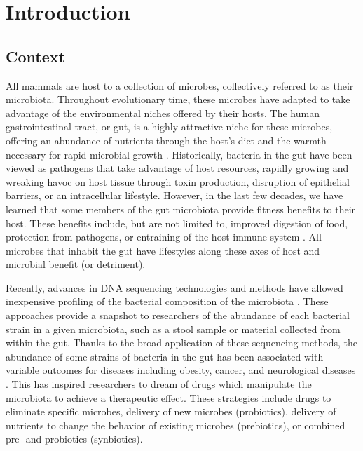 \documentclass[11pt,twocolumn,notitlepage,openany,twoside]{book}
\begin{document}
\chapter{Introduction}
\begin{refsection}

\section{Context}

All mammals are host to a collection of microbes, collectively referred to as their microbiota. Throughout evolutionary time, these microbes have adapted to take advantage of the environmental niches offered by their hosts. The human gastrointestinal tract, or gut, is a highly attractive niche for these microbes, offering an abundance of nutrients through the host’s diet and the warmth necessary for rapid microbial growth \cite{Turnbaugh2007-cd}. Historically, bacteria in the gut have been viewed as pathogens that take advantage of host resources, rapidly growing and wreaking havoc on host tissue through toxin production, disruption of epithelial barriers, or an intracellular lifestyle. However, in the last few decades, we have learned that some members of the gut microbiota provide fitness benefits to their host. These benefits include, but are not limited to, improved digestion of food, protection from pathogens, or entraining of the host immune system \cite{Britton2014-wm,Buffie2013-xt,Wilson1988-ed,Stecher2008-bc,Lawley2013-ez,Gillis2018-mt}. All microbes that inhabit the gut have lifestyles along these axes of host and microbial benefit (or detriment).

Recently, advances in DNA sequencing technologies and methods have allowed inexpensive profiling of the bacterial composition of the microbiota \cite{Turnbaugh2007-cd}. These approaches provide a snapshot to researchers of the abundance of each bacterial strain in a given microbiota, such as a stool sample or material collected from within the gut. Thanks to the broad application of these sequencing methods, the abundance of some strains of bacteria in the gut has been associated with variable outcomes for diseases including obesity, cancer, and neurological diseases \cite{Young2017-xs}. This has inspired researchers to dream of drugs which manipulate the microbiota to achieve a therapeutic effect. These strategies include drugs to eliminate specific microbes, delivery of new microbes (probiotics), delivery of nutrients to change the behavior of existing microbes (prebiotics), or combined pre- and probiotics (synbiotics)\cite{OToole2017-th}.


\end{refsection}
\end{document}
